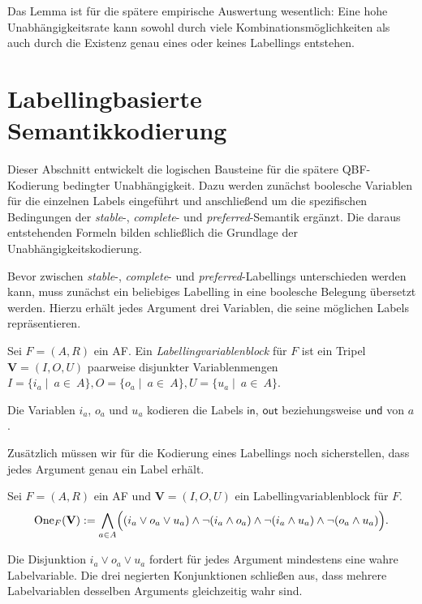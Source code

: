 Das Lemma ist für die spätere empirische Auswertung wesentlich: Eine hohe
Unabhängigkeitsrate kann sowohl durch viele Kombinationsmöglichkeiten als auch 
durch die Existenz genau eines oder keines Labellings entstehen.

\section{Labellingbasierte Semantikkodierung}
\label{sec:semantics-encoding}
Dieser Abschnitt entwickelt die logischen Bausteine für die spätere QBF-Kodierung bedingter Unabhängigkeit.
Dazu werden zunächst boolesche Variablen für die einzelnen Labels eingeführt und anschließend um die spezifischen Bedingungen
der \emph{stable}-, \emph{complete}- und \emph{preferred}-Semantik ergänzt.
Die daraus entstehenden Formeln bilden schließlich die Grundlage der Unabhängigkeitskodierung.

Bevor zwischen \emph{stable}-, \emph{complete}- und \emph{preferred}-Labellings unterschieden werden kann, 
muss zunächst ein beliebiges Labelling in eine boolesche Belegung übersetzt werden.
Hierzu erhält jedes Argument drei Variablen, die seine möglichen Labels repräsentieren.

\begin{Definition}
    \label{def:labelling-variable-block}
    Sei \(F=(A,R)\) ein AF. Ein
    \emph{Labellingvariablenblock} für \(F\) ist ein Tripel
    \(\mathbf{V}=(I,O,U)\) paarweise disjunkter Variablenmengen
\(
        I=\{i_a\mid~a\in~A\}, 
        O=\{o_a\mid~a\in~A\}, 
        U=\{u_a\mid~a\in~A\}.
\)
\end{Definition}
Die Variablen \(i_a\), \(o_a\) und \(u_a\) kodieren die Labels
\(\mathsf{in}\), \(\mathsf{out}\) beziehungsweise \(\mathsf{und}\)
von \(a\). 

Zusätzlich müssen wir für die Kodierung eines Labellings noch sicherstellen, dass jedes Argument 
genau ein Label erhält. 
\begin{Definition}
\label{def:One}
    Sei \(F=(A,R)\) ein AF und
    \(\mathbf V=(I,O,U)\) ein Labellingvariablenblock für \(F\).
    \[
        \operatorname{One}_F(\mathbf V)
        :=
        \bigwedge_{a\in A}
        \Bigl(
            (i_a\lor o_a\lor u_a)
            \land\neg(i_a\land o_a)
            \land\neg(i_a\land u_a)
            \land\neg(o_a\land u_a)
        \Bigr).
    \]
\end{Definition}
Die Disjunktion \(i_a\lor o_a\lor u_a\) fordert für jedes Argument
mindestens eine wahre Labelvariable. Die drei negierten Konjunktionen
schließen aus, dass mehrere Labelvariablen desselben Arguments
gleichzeitig wahr sind.

